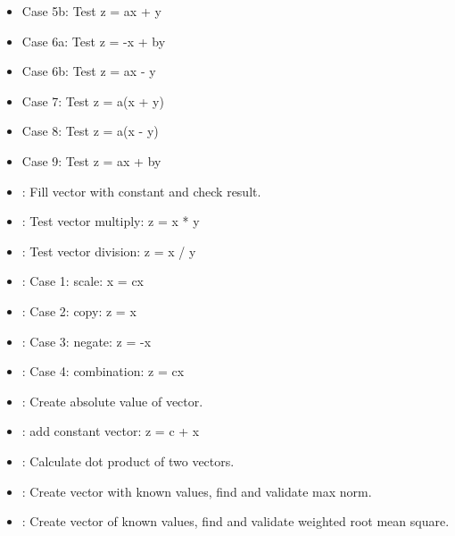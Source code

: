 \documentclass[letterpaper,10pt,english]{sphinxmanual}
\begin{document}
\begin{itemize}
\item {} 
 Case 5b: Test z = ax + y

\item {} 
 Case 6a: Test z = -x + by

\item {} 
 Case 6b: Test z = ax - y

\item {} 
 Case 7:  Test z = a(x + y)

\item {} 
 Case 8:  Test z = a(x - y)

\item {} 
 Case 9:  Test z = ax + by

\item {} 
: Fill vector with constant and check result.

\item {} 
: Test vector multiply: z = x * y

\item {} 
: Test vector division: z = x / y

\item {} 
: Case 1: scale: x = cx

\item {} 
: Case 2: copy: z = x

\item {} 
: Case 3: negate: z = -x

\item {} 
: Case 4: combination: z = cx

\item {} 
: Create absolute value of vector.

\item {} 
: add constant vector: z = c + x

\item {} 
: Calculate dot product of two vectors.

\item {} 
: Create vector with known values, find and validate max norm.

\item {} 
: Create vector of known values, find and validate weighted root mean square.


\end{itemize}
\end{document}
